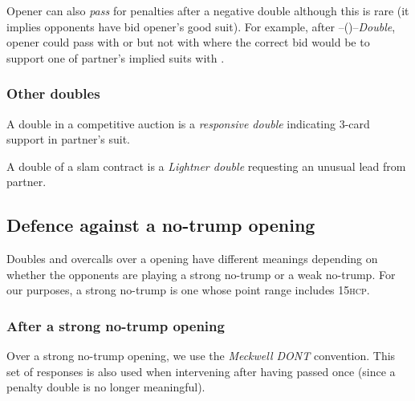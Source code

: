 \documentclass[a4paper,article,oneside]{memoir}
\newcommand{\hcp}{\textsc{hcp}}
\begin{document}
Opener can also \emph{pass} for penalties after a negative double
although this is rare (it implies opponents have bid opener's good
suit). For example, after --()--\emph{Double}, opener
could pass with  or 
but not with  where the correct bid would be to
support one of partner's implied suits with .

\subsubsection{Other doubles}

A double in a competitive auction is a \emph{responsive double}
indicating 3-card support in partner's suit.

A double of a slam contract is a \emph{Lightner double} requesting an
unusual lead from partner.

\subsection{Defence against a no-trump opening}

Doubles and overcalls over a  opening have different meanings
depending on whether the opponents are playing a strong no-trump or a
weak no-trump. For our purposes, a strong no-trump is one whose point
range includes 15\hcp.

\subsubsection{After a strong no-trump opening}

Over a strong no-trump opening, we use the \emph{Meckwell DONT}
convention. This set of responses is also used when intervening after
having passed once (since a penalty double is no longer meaningful).
\end{document}
